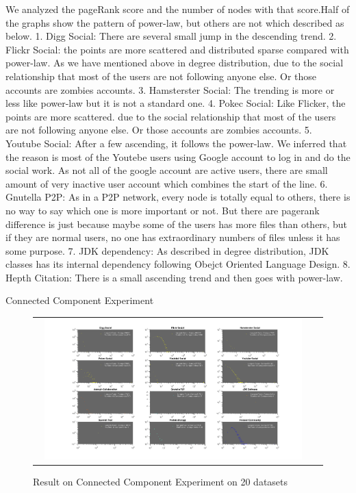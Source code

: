 We analyzed the pageRank score and the number of nodes with that score.Half of the graphs show the pattern of power-law, but others are not which described as below.
1. Digg Social: There are several small jump in the descending trend.
2. Flickr Social: the points are more scattered and distributed sparse compared with power-law. As we have mentioned above in degree distribution, due to the social relationship that most of the users are not following anyone else. Or those accounts are zombies accounts.
3. Hamsterster Social: The trending is more or less like power-law but it is not a standard one.
4. Pokec Social: Like Flicker, the points are more scattered. due to the social relationship that most of the users are not following anyone else. Or those accounts are zombies accounts.
5. Youtube Social: After a few ascending, it follows the power-law. We inferred that the reason is most of the Youtebe users using Google account to log in and do the social work. As not all of the google account are active users, there are small amount of very inactive user account which combines the start of the line.
6. Gnutella P2P: As in a P2P network, every node is totally equal to others, there is no way to say which one is more important or not. But there are pagerank difference is just because maybe some of the users has more files than others, but if they are normal users, no one has extraordinary numbers of files unless it has some purpose.
7. JDK dependency: As described in degree distribution, JDK classes has its internal dependency following Obejct Oriented Language Design.
8. Hepth Citation: There is a small ascending trend and then goes with power-law. 

Connected Component Experiment

\begin{figure}[H]
\begin{center}
\begin{tabular}{cc}
     \includegraphics[width=0.95\textwidth]{FIG/cc1 2.png}
\end{tabular}
\caption{Result on Connected Component Experiment on 20 datasets}
\end{center}
\end{figure}

